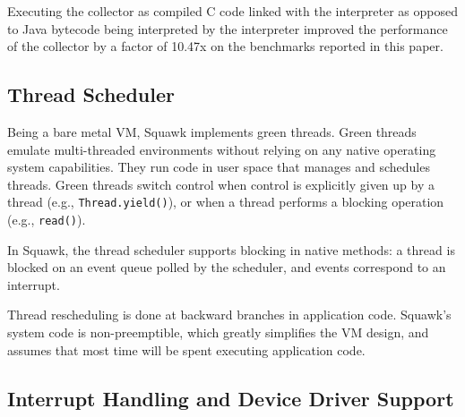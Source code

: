 \documentclass{sigplanconf}
\begin{document}
Executing the collector as compiled C code linked with the 
interpreter as opposed to Java bytecode being interpreted by 
the interpreter improved the performance of the collector by 
a factor of 10.47x on the benchmarks reported in this paper.
%


\subsection{Thread Scheduler}
\label{sec-threads}

Being a bare metal VM, Squawk implements green threads. 
Green threads emulate multi-threaded environments without relying on
any native operating system capabilities.  They run code in user 
space that manages and schedules threads.
Green threads switch control when control is explicitly given up by 
a thread (e.g., \texttt{Thread.yield()}), or when a thread performs a blocking
operation (e.g., \texttt{read()}). 

In Squawk, the thread scheduler supports blocking in native methods: 
a thread is blocked on an event queue polled by the scheduler, 
and events correspond to an interrupt.

Thread rescheduling is done at backward branches in application code. 
Squawk's system code is non-preemptible, which greatly simplifies
the VM design, and assumes that most time will be spent executing 
application code. 


\subsection{Interrupt Handling and Device Driver Support}
\label{sec-interrupts} 
\end{document}
